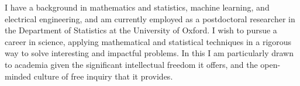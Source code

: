 \documentclass[9pt]{developercv} %
\begin{document}
\vspace{1cm}



\begin{minipage}[t]{\textwidth} %
    \vspace{-\baselineskip} %
    {
      I have a background in mathematics and statistics, machine learning, and electrical engineering, and am currently employed as a postdoctoral researcher in the Department of Statistics at the University of Oxford.
      I wish to pursue a career in science, applying mathematical and statistical techniques in a rigorous way to solve interesting and impactful problems.
      In this I am particularly drawn to academia given the significant intellectual freedom it offers, and the open-minded culture of free inquiry that it provides.
      

      
      
    }


\end{minipage}
\end{document}
